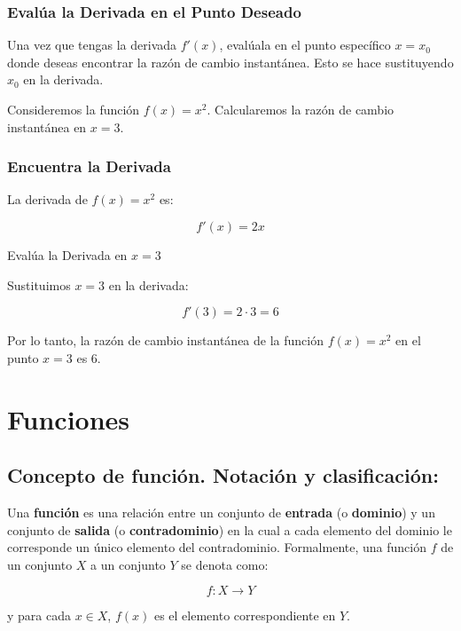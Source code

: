 \subsubsection{Evalúa la Derivada en el Punto Deseado}

Una vez que tengas la derivada \( f'(x) \), evalúala en el punto específico \( x = x_0 \) donde deseas encontrar la razón de cambio instantánea. Esto se hace sustituyendo \( x_0 \) en la derivada.

\begin{example}
    Consideremos la función \( f(x) = x^2 \). Calcularemos la razón de cambio instantánea en \( x = 3 \).

\subsubsection{Encuentra la Derivada}

La derivada de \( f(x) = x^2 \) es:

\[
f'(x) = 2x
\]

Evalúa la Derivada en \( x = 3 \)

Sustituimos \( x = 3 \) en la derivada:

\[
f'(3) = 2 \cdot 3 = 6
\]

Por lo tanto, la razón de cambio instantánea de la función \( f(x) = x^2 \) en el punto \( x = 3 \) es 6.

\end{example}


\section{Funciones} %
\subsection{Concepto de función. Notación y clasificación:}
\begin{definition}[Función]
    Una \textbf{función} es una relación entre un conjunto de \textbf{entrada} (o \textbf{dominio}) y un conjunto de \textbf{salida} (o \textbf{contradominio}) en la cual a cada elemento del dominio le corresponde un único elemento del contradominio. Formalmente, una función \( f \) de un conjunto \( X \) a un conjunto \( Y \) se denota como:

\begin{equation}
    f: X \rightarrow Y
\end{equation}

y para cada \( x \in X \), \( f(x) \) es el elemento correspondiente en \( Y \). 
\end{definition}

